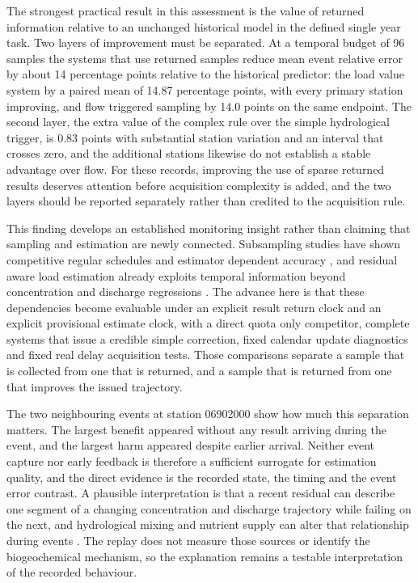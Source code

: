 \documentclass[lineno,pdflatex,sn-apa]{sn-jnl}%
\theoremstyle{thmstyleone}%
\theoremstyle{thmstyletwo}%
\theoremstyle{thmstylethree}%
\begin{document}
The strongest practical result in this assessment is the value of returned information relative to an unchanged historical model in the defined single year task. Two layers of improvement must be separated. At a temporal budget of 96 samples the systems that use returned samples reduce mean event relative error by about 14 percentage points relative to the historical predictor: the load value system by a paired mean of 14.87 percentage points, with every primary station improving, and flow triggered sampling by 14.0 points on the same endpoint. The second layer, the extra value of the complex rule over the simple hydrological trigger, is 0.83 points with substantial station variation and an interval that crosses zero, and the additional stations likewise do not establish a stable advantage over flow. For these records, improving the use of sparse returned results deserves attention before acquisition complexity is added, and the two layers should be reported separately rather than credited to the acquisition rule.

This finding develops an established monitoring insight rather than claiming that sampling and estimation are newly connected. Subsampling studies have shown competitive regular schedules and estimator dependent accuracy \citep{reynolds2016,lee2016,lee2019}, and residual aware load estimation already exploits temporal information beyond concentration and discharge regressions \citep{zhang2019}. The advance here is that these dependencies become evaluable under an explicit result return clock and an explicit provisional estimate clock, with a direct quota only competitor, complete systems that issue a credible simple correction, fixed calendar update diagnostics and fixed real delay acquisition tests. Those comparisons separate a sample that is collected from one that is returned, and a sample that is returned from one that improves the issued trajectory.

The two neighbouring events at station 06902000 show how much this separation matters. The largest benefit appeared without any result arriving during the event, and the largest harm appeared despite earlier arrival. Neither event capture nor early feedback is therefore a sufficient surrogate for estimation quality, and the direct evidence is the recorded state, the timing and the event error contrast. A plausible interpretation is that a recent residual can describe one segment of a changing concentration and discharge trajectory while failing on the next, and hydrological mixing and nutrient supply can alter that relationship during events \citep{bieroza2018}. The replay does not measure those sources or identify the biogeochemical mechanism, so the explanation remains a testable interpretation of the recorded behaviour.
\end{document}
